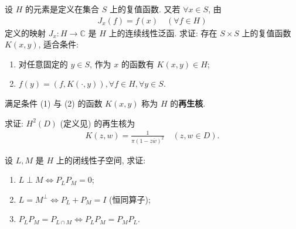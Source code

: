 \documentclass[../../main.tex]{subfiles}%
\begin{document}
\begin{example}
设 $H$ 的元素是定义在集合 $S$ 上的复值函数. 又若 $\forall x \in S$, 由
\begin{align*}
J_x(f) = f(x) \quad (\forall f \in H)
\end{align*}
定义的映射 $J_x: H \to \mathbb{C}$ 是 $H$ 上的连续线性泛函. 求证: 存在 $S \times S$ 上的复值函数 $K(x,y)$, 适合条件:
\begin{enumerate}[(1)]
\item 对任意固定的 $y \in S$, 作为 $x$ 的函数有 $K(x,y) \in H$;
\item $f(y) = (f, K(\cdot, y)), \forall f \in H, \forall y \in S$.
\end{enumerate}
\end{example}

\begin{remark}
满足条件 (1) 与 (2) 的函数 $K(x,y)$ 称为 $H$ 的\textbf{再生核}.
\end{remark}

\begin{example}
求证: $H^2(D)$ (定义见) 的再生核为
\begin{align*}
K(z,w) = \frac{1}{\pi(1 - z\overline{w})^2} \quad (z,w \in D).
\end{align*}
\end{example}

\begin{example}
设 $L, M$ 是 $H$ 上的闭线性子空间, 求证:
\begin{enumerate}[(1)]
\item $L \perp M \iff P_L P_M = 0$;
\item $L = M^\perp \iff P_L + P_M = I$ (恒同算子);
\item $P_L P_M = P_{L \cap M} \iff P_L P_M = P_M P_L$.
\end{enumerate}
\end{example}
\end{document}
